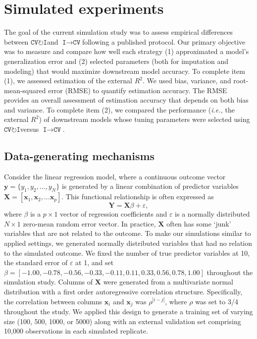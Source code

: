 \documentclass[AMA,STIX1COL,doublespace]{WileyNJD-v2}
\begin{document}
\section{Simulated experiments} \label{sec:sim}

The goal of the current simulation study was to assess empirical
differences between
$\texttt{CV}\!\circlearrowright\!\texttt{I}$\space and
$\texttt{I}\!\!\rightarrow\!\texttt{CV}$\space following a published
protocol.\cite{morris2019using} Our primary objective was to measure and
compare how well each strategy (1) approximated a model's generalization
error and (2) selected parameters (both for imputation and modeling)
that would maximize downstream model accuracy. To complete item (1), we
assessed estimation of the external \(R^2\). We used bias, variance, and
root-mean-squared error (RMSE) to quantify estimation accuracy. The RMSE
provides an overall assessment of estimation accuracy that depends on
both bias and variance. To complete item (2), we compared the
performance (\textit{i.e., }the external \(R^2\)) of downstream models
whose tuning parameters were selected using
$\texttt{CV}\!\circlearrowright\!\texttt{I}$\space versus
$\texttt{I}\!\!\rightarrow\!\texttt{CV}$.

\subsection{Data-generating mechanisms} \label{subsec:data_gen}

Consider the linear regression model, where a continuous outcome vector
\(\textbf{y} = \lbrace y_1, y_2, \ldots, y_N\rbrace\) is generated by a
linear combination of predictor variables
\(\textbf{X} = \left[ \textbf{x}_1, \textbf{x}_2, \ldots \textbf{x}_p \right]\).
This functional relationship is often expressed as
\[\textbf{Y} = \textbf{X} \beta + \varepsilon,\] where \(\beta\) is a
\(p \times 1\) vector of regression coefficients and \(\varepsilon\) is
a normally distributed \(N \times 1\) zero-mean random error vector. In
practice, \(\textbf{X}\) often has some `junk' variables that are not
related to the outcome. To make our simulations similar to applied
settings, we generated normally distributed variables that had no
relation to the simulated outcome. We fixed the number of true predictor
variables at 10, the standard error of \(\varepsilon\) at 1, and set
\(\beta = [-1.00, -0.78, -0.56, -0.33, -0.11, 0.11, 0.33, 0.56, 0.78, 1.00]\)
throughout the simulation study. Columns of \(\textbf{X}\) were
generated from a multivariate normal distribution with a first order
autoregressive correlation structure. Specifically, the correlation
between columns \(\textbf{x}_i\) and \(\textbf{x}_j\) was
\(\rho^{\left| i-j \right|}\), where \(\rho\) was set to 3/4 throughout
the study. We applied this design to generate a training set of varying
size (100, 500, 1000, or 5000) along with an external validation set
comprising 10,000 observations in each simulated replicate.
\end{document}
